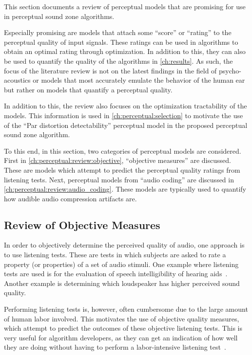 This section documents a review of perceptual models that are promising for use in perceptual sound zone
algorithms.

Especially promising are models that attach some ``score'' or ``rating'' to the perceptual quality of input signals.
These ratings can be used in algorithms to obtain an optimal rating through optimization.
In addition to this, they can also be used to quantify the quality of the algorithms in \autoref{ch:results}.
As such, the focus of the literature review is not on the latest findings in the field of psycho-acoustics or models that most accurately emulate the behavior of the human ear but rather on models that quantify a perceptual quality.

In addition to this, the review also focuses on the optimization tractability of the models.
This information is used in \autoref{ch:perceptual:selection} to motivate the use of the ``Par distortion detectability'' perceptual model in the proposed perceptual sound zone algorithm.

To this end, in this section, two categories of perceptual models are considered.
First in \autoref{ch:perceptual:review:objective}, ``objective measures'' are discussed.
These are models which attempt to predict the perceptual quality ratings from listening tests. 
Next, perceptual models from ``audio coding'' are discussed in \autoref{ch:perceptual:review:audio_coding}.
These models are typically used to quantify how audible audio compression artifacts are.


\subsection{Review of Objective Measures}
\label{ch:perceptual:review:objective}
In order to objectively determine the perceived quality of audio, one approach is to use listening tests.
These are tests in which subjects are asked to rate a property (or properties) of a set of audio stimuli.
One example where listening tests are used is for the evaluation of speech intelligibility of hearing aids~\cite{taal2011algorithm}.
Another example is determining which loudspeaker has higher perceived sound quality.

Performing listening tests is, however, often cumbersome due to the large amount of human labor involved.
This motivates the use of objective quality measures, which attempt to predict the outcomes of these objective listening tests.
This is very useful for algorithm developers, as they can get an indication of how well they are doing
without having to perform a labor-intensive listening test~\cite{taal2011algorithm}.

